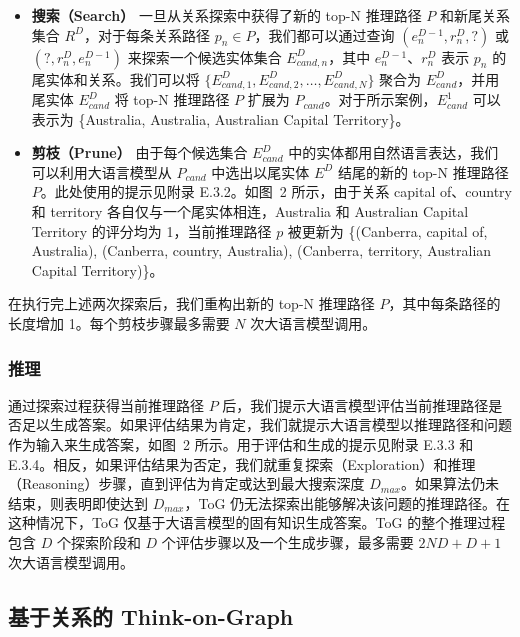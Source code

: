 \documentclass[11pt,UTF8,fontset=fandol]{ctexart}
\begin{document}
\begin{itemize}[leftmargin=1.4em]
\item \textbf{搜索（Search）} 一旦从关系探索中获得了新的 top-N 推理路径 $P$ 和新尾关系集合 $R^D$，对于每条关系路径 $p_n \in P$，我们都可以通过查询 $(e_n^{D-1}, r_n^D, ?)$ 或 $(?, r_n^D, e_n^{D-1})$ 来探索一个候选实体集合 $E_{cand,n}^D$，其中 $e_n^{D-1}$、$r_n^D$ 表示 $p_n$ 的尾实体和关系。我们可以将 $\{E_{cand,1}^D, E_{cand,2}^D, \dots, E_{cand,N}^D\}$ 聚合为 $E_{cand}^D$，并用尾实体 $E_{cand}^D$ 将 top-N 推理路径 $P$ 扩展为 $P_{cand}$。对于所示案例，$E_{cand}^1$ 可以表示为 \{Australia, Australia, Australian Capital Territory\}。
\item \textbf{剪枝（Prune）} 由于每个候选集合 $E_{cand}^D$ 中的实体都用自然语言表达，我们可以利用大语言模型从 $P_{cand}$ 中选出以尾实体 $E^D$ 结尾的新的 top-N 推理路径 $P$。此处使用的提示见附录 E.3.2。如图~2 所示，由于关系 capital of、country 和 territory 各自仅与一个尾实体相连，Australia 和 Australian Capital Territory 的评分均为 1，当前推理路径 $p$ 被更新为 \{(Canberra, capital of, Australia), (Canberra, country, Australia), (Canberra, territory, Australian Capital Territory)\}。
\end{itemize}

在执行完上述两次探索后，我们重构出新的 top-N 推理路径 $P$，其中每条路径的长度增加 1。每个剪枝步骤最多需要 $N$ 次大语言模型调用。

\subsubsection{推理}

通过探索过程获得当前推理路径 $P$ 后，我们提示大语言模型评估当前推理路径是否足以生成答案。如果评估结果为肯定，我们就提示大语言模型以推理路径和问题作为输入来生成答案，如图~2 所示。用于评估和生成的提示见附录 E.3.3 和 E.3.4。相反，如果评估结果为否定，我们就重复探索（Exploration）和推理（Reasoning）步骤，直到评估为肯定或达到最大搜索深度 $D_{max}$。如果算法仍未结束，则表明即使达到 $D_{max}$，ToG 仍无法探索出能够解决该问题的推理路径。在这种情况下，ToG 仅基于大语言模型的固有知识生成答案。ToG 的整个推理过程包含 $D$ 个探索阶段和 $D$ 个评估步骤以及一个生成步骤，最多需要 $2ND + D + 1$ 次大语言模型调用。

\subsection{基于关系的 Think-on-Graph}
\end{document}
